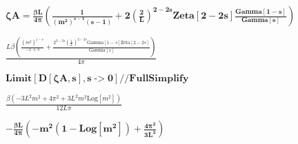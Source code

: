 \documentclass{article}
\begin{document}
\begin{doublespace}
\noindent\(\pmb{\text{$\zeta $A}=\frac{\beta  L}{4\pi }\left(\frac{1}{\left(m^2\right)^{s-1}(s-1)}+2\left(\frac{2}{L}\right)^{2-2s}\text{Zeta}[2-2s]\frac{\text{Gamma}[1-s]}{\text{Gamma}[s]}\right)}\)
\end{doublespace}

\begin{doublespace}
\noindent\(\frac{L \beta  \left(\frac{\left(m^2\right)^{1-s}}{-1+s}+\frac{2^{3-2 s} \left(\frac{1}{L}\right)^{2-2 s} \text{Gamma}[1-s] \text{Zeta}[2-2
s]}{\text{Gamma}[s]}\right)}{4 \pi }\)
\end{doublespace}

\begin{doublespace}
\noindent\(\pmb{\text{Limit}[D[\text{$\zeta $A},s],s\text{-$>$}0]\text{//}\text{FullSimplify}}\)
\end{doublespace}

\begin{doublespace}
\noindent\(\frac{\beta  \left(-3 L^2 m^2+4 \pi ^2+3 L^2 m^2 \text{Log}\left[m^2\right]\right)}{12 L \pi }\)
\end{doublespace}

\begin{doublespace}
\noindent\(\pmb{-\frac{\beta  L}{4\pi }\left(-m^2\left(1-\text{Log}\left[m^2\right]\right)+\frac{4 \pi ^2}{3L^2}\right)}\)
\end{doublespace}
\end{document}
